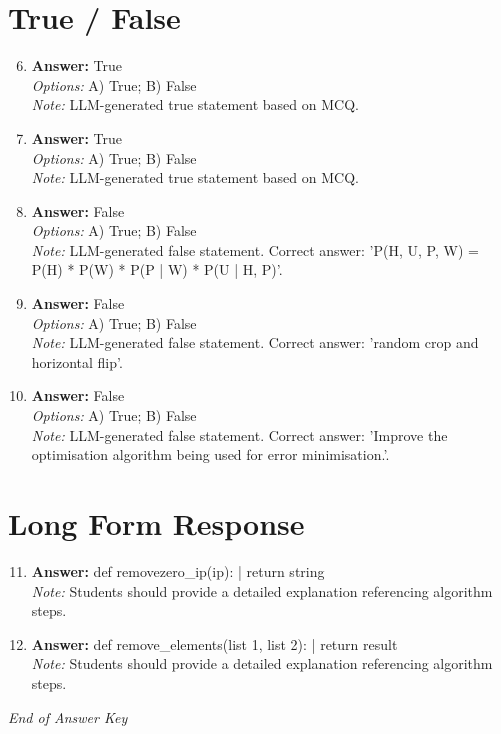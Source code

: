 \documentclass[12pt]{article}
\begin{document}
\section*{True / False}
\begin{enumerate}[label=\arabic*.]
\setcounter{enumi}{5}
\item \textbf{Answer:} True
\\ \textit{Options:} A) True; B) False
\\ \textit{Note:} LLM-generated true statement based on MCQ.
\item \textbf{Answer:} True
\\ \textit{Options:} A) True; B) False
\\ \textit{Note:} LLM-generated true statement based on MCQ.
\item \textbf{Answer:} False
\\ \textit{Options:} A) True; B) False
\\ \textit{Note:} LLM-generated false statement. Correct answer: 'P(H, U, P, W) = P(H) * P(W) * P(P | W) * P(U | H, P)'.
\item \textbf{Answer:} False
\\ \textit{Options:} A) True; B) False
\\ \textit{Note:} LLM-generated false statement. Correct answer: 'random crop and horizontal flip'.
\item \textbf{Answer:} False
\\ \textit{Options:} A) True; B) False
\\ \textit{Note:} LLM-generated false statement. Correct answer: 'Improve the optimisation algorithm being used for error minimisation.'.
\end{enumerate}

\section*{Long Form Response}
\begin{enumerate}[label=\arabic*.]
\setcounter{enumi}{10}
\item \textbf{Answer:} def removezero\_ip(ip): | return string
\\ \textit{Note:} Students should provide a detailed explanation referencing algorithm steps.
\item \textbf{Answer:} def remove\_elements(list 1, list 2): | return result
\\ \textit{Note:} Students should provide a detailed explanation referencing algorithm steps.
\end{enumerate}

\vfill
\noindent\textit{End of Answer Key}
\end{document}
